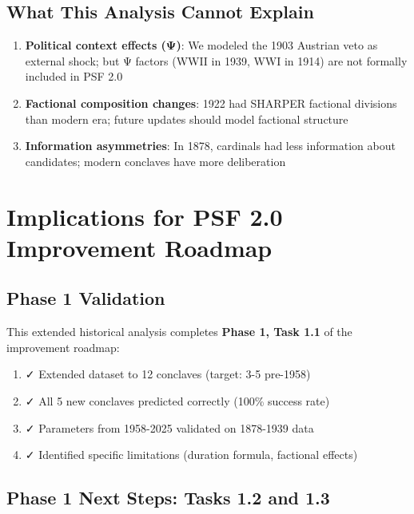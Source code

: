 \documentclass[11pt,a4paper]{article}
\begin{document}
\subsection{What This Analysis Cannot Explain}

\begin{enumerate}
    \item \textbf{Political context effects (Ψ)}: We modeled the 1903 Austrian veto as external shock; but Ψ factors (WWII in 1939, WWI in 1914) are not formally included in PSF 2.0
    \item \textbf{Factional composition changes}: 1922 had SHARPER factional divisions than modern era; future updates should model factional structure
    \item \textbf{Information asymmetries}: In 1878, cardinals had less information about candidates; modern conclaves have more deliberation
\end{enumerate}


\section{Implications for PSF 2.0 Improvement Roadmap}

\subsection{Phase 1 Validation}

This extended historical analysis completes \textbf{Phase 1, Task 1.1} of the improvement roadmap:

\begin{enumerate}
    \item ✓ Extended dataset to 12 conclaves (target: 3-5 pre-1958)
    \item ✓ All 5 new conclaves predicted correctly (100\% success rate)
    \item ✓ Parameters from 1958-2025 validated on 1878-1939 data
    \item ✓ Identified specific limitations (duration formula, factional effects)
\end{enumerate}

\subsection{Phase 1 Next Steps: Tasks 1.2 and 1.3}
\end{document}
